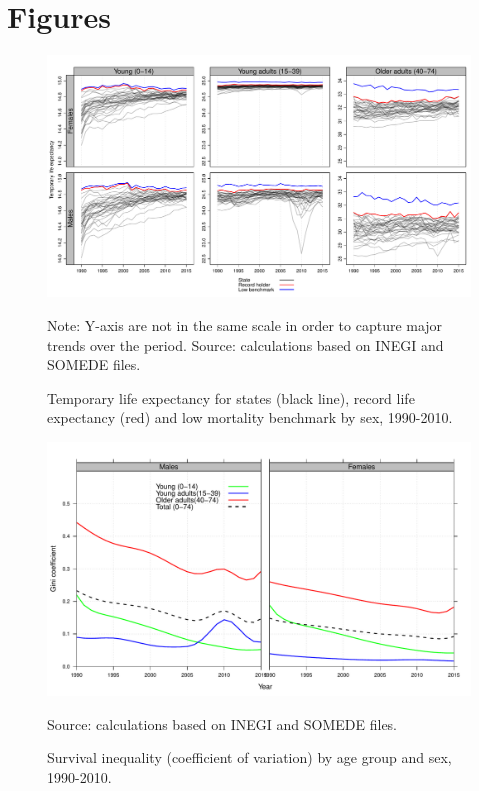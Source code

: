 \documentclass[11.5pt]{article}
\begin{document}
\section*{Figures}

\begin{figure}[h!]
\centering
\caption{Temporary life expectancy for states (black line), record life
expectancy (red) and low mortality benchmark by sex, 1990-2010.}
\label{Fig1:temp}
\includegraphics[scale=.5]{Figure_1.pdf}

Note: Y-axis are not in the same scale in order to capture major trends over the period. Source: calculations based on INEGI and SOMEDE files. 
\end{figure}



\begin{figure}[h!]
\centering
\caption{Survival inequality (coefficient of variation) by age group and sex, 1990-2010.}
\label{fig:Gini}
\includegraphics[scale=.5]{Gini_fig.pdf}

 Source: calculations based on INEGI and SOMEDE files.
\end{figure}
\end{document}
